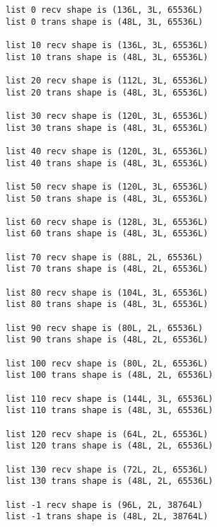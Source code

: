 \documentclass[11pt]{article}
\begin{document}
    \begin{Verbatim}[commandchars=\\\{\}]
list 0 recv shape is (136L, 3L, 65536L)
list 0 trans shape is (48L, 3L, 65536L)

list 10 recv shape is (136L, 3L, 65536L)
list 10 trans shape is (48L, 3L, 65536L)

list 20 recv shape is (112L, 3L, 65536L)
list 20 trans shape is (48L, 3L, 65536L)

list 30 recv shape is (120L, 3L, 65536L)
list 30 trans shape is (48L, 3L, 65536L)

list 40 recv shape is (120L, 3L, 65536L)
list 40 trans shape is (48L, 3L, 65536L)

list 50 recv shape is (120L, 3L, 65536L)
list 50 trans shape is (48L, 3L, 65536L)

list 60 recv shape is (128L, 3L, 65536L)
list 60 trans shape is (48L, 3L, 65536L)

list 70 recv shape is (88L, 2L, 65536L)
list 70 trans shape is (48L, 2L, 65536L)

list 80 recv shape is (104L, 3L, 65536L)
list 80 trans shape is (48L, 3L, 65536L)

list 90 recv shape is (80L, 2L, 65536L)
list 90 trans shape is (48L, 2L, 65536L)

list 100 recv shape is (80L, 2L, 65536L)
list 100 trans shape is (48L, 2L, 65536L)

list 110 recv shape is (144L, 3L, 65536L)
list 110 trans shape is (48L, 3L, 65536L)

list 120 recv shape is (64L, 2L, 65536L)
list 120 trans shape is (48L, 2L, 65536L)

list 130 recv shape is (72L, 2L, 65536L)
list 130 trans shape is (48L, 2L, 65536L)

list -1 recv shape is (96L, 2L, 38764L)
list -1 trans shape is (48L, 2L, 38764L)


    \end{Verbatim}
\end{document}
